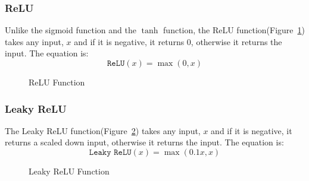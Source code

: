 \documentclass[titlepage]{article}
\begin{document}
\subsubsection{ReLU}
Unlike the sigmoid function and the $\tanh$ function, the ReLU function(Figure~\ref{fig:relu}) takes any input, $x$ and if it is negative, it returns 0, otherwise it returns the input. The equation is:
\begin{equation}
    \texttt{ReLU}(x) = \max(0, x)
    \label{eq:relu}
\end{equation}

\begin{figure}[h!]
    \begin{center}
    \end{center}
    \caption{ReLU Function}  
    \label{fig:relu}
\end{figure}

\subsubsection{Leaky ReLU}
The Leaky ReLU function(Figure~\ref{fig:leaky-relu}) takes any input, $x$ and if it is negative, it returns a scaled down input, otherwise it returns the input. The equation is:
\begin{equation}
    \texttt{Leaky ReLU}(x) = \max(0.1x, x)
    \label{eq:leaky-relu}
\end{equation}
\begin{figure}[h!]
    \begin{center}
    \end{center}
    \caption{Leaky ReLU Function}    
    \label{fig:leaky-relu}
\end{figure}
\end{document}
